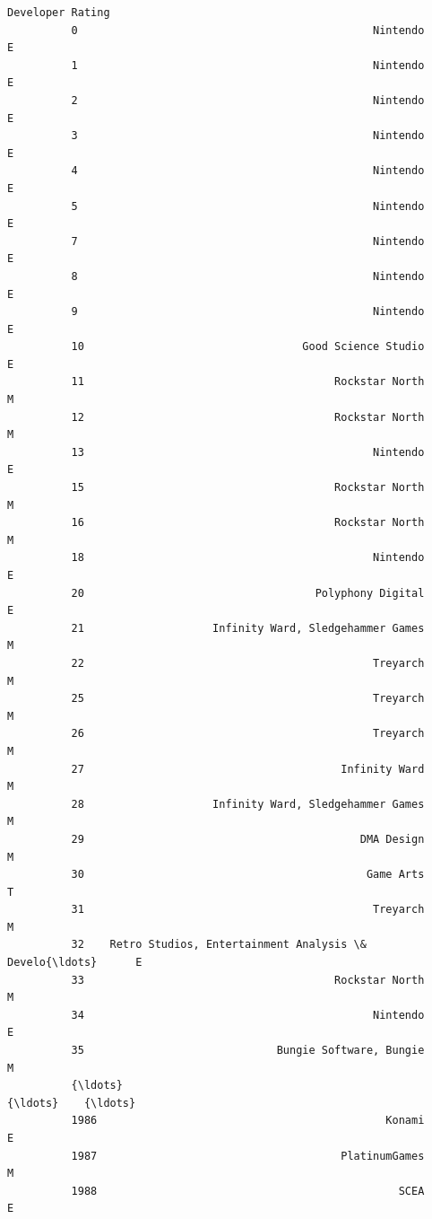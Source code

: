 \documentclass[11pt]{article}
\begin{document}
\begin{Verbatim}[commandchars=\\\{\}]
                                                        Developer Rating  
          0                                              Nintendo      E  
          1                                              Nintendo      E  
          2                                              Nintendo      E  
          3                                              Nintendo      E  
          4                                              Nintendo      E  
          5                                              Nintendo      E  
          7                                              Nintendo      E  
          8                                              Nintendo      E  
          9                                              Nintendo      E  
          10                                  Good Science Studio      E  
          11                                       Rockstar North      M  
          12                                       Rockstar North      M  
          13                                             Nintendo      E  
          15                                       Rockstar North      M  
          16                                       Rockstar North      M  
          18                                             Nintendo      E  
          20                                    Polyphony Digital      E  
          21                    Infinity Ward, Sledgehammer Games      M  
          22                                             Treyarch      M  
          25                                             Treyarch      M  
          26                                             Treyarch      M  
          27                                        Infinity Ward      M  
          28                    Infinity Ward, Sledgehammer Games      M  
          29                                           DMA Design      M  
          30                                            Game Arts      T  
          31                                             Treyarch      M  
          32    Retro Studios, Entertainment Analysis \& Develo{\ldots}      E  
          33                                       Rockstar North      M  
          34                                             Nintendo      E  
          35                              Bungie Software, Bungie      M  
          {\ldots}                                                 {\ldots}    {\ldots}  
          1986                                             Konami      E  
          1987                                      PlatinumGames      M  
          1988                                               SCEA      E  

\end{Verbatim}
\end{document}
